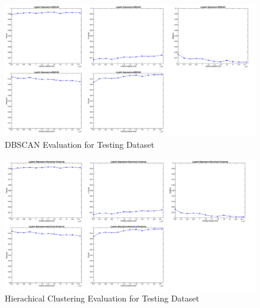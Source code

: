 \begin{figure}
\centering
\includegraphics[scale=0.23]{DBTest.pdf}
\caption{DBSCAN Evaluation for Testing Dataset}
\end{figure}
\begin{figure}
\centering
\includegraphics[scale=0.23]{HITest.pdf}
\caption{Hierachical Clustering Evaluation for Testing Dataset}
\end{figure}
   

